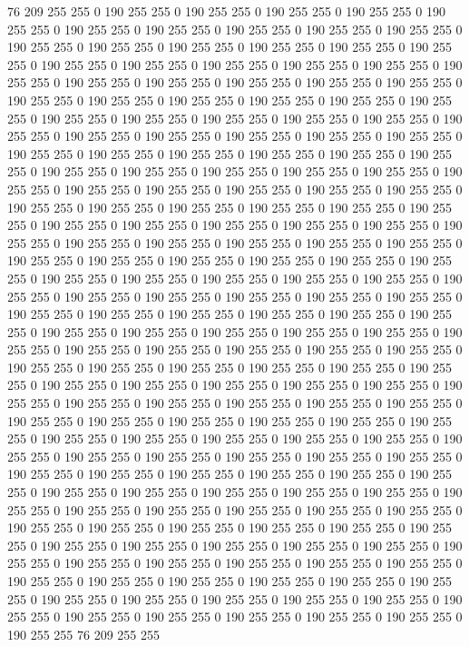 76 209 255 255 0 190 255 255 0 190 255 255 0 190 255 255 0 190 255 255 0 190 255 255 0 190 255 255 0 190 255 255 0 190 255 255 0 190 255 255 0 190 255 255 0 190 255 255 0 190 255 255 0 190 255 255 0 190 255 255 0 190 255 255 0 190 255 255 0 190 255 255 0 190 255 255 0 190 255 255 0 190 255 255 0 190 255 255 0 190 255 255 0 190 255 255 0 190 255 255 0 190 255 255 0 190 255 255 0 190 255 255 0 190 255 255 0 190 255 255 0 190 255 255 0 190 255 255 0 190 255 255 0 190 255 255 0 190 255 255 0 190 255 255 0 190 255 255 0 190 255 255 0 190 255 255 0 190 255 255 0 190 255 255 0 190 255 255 0 190 255 255 0 190 255 255 0 190 255 255 0 190 255 255 0 190 255 255 0 190 255 255 0 190 255 255 0 190 255 255 
0 190 255 255 0 190 255 255 0 190 255 255 0 190 255 255 0 190 255 255 0 190 255 255 0 190 255 255 0 190 255 255 0 190 255 255 0 190 255 255 0 190 255 255 0 190 255 255 0 190 255 255 0 190 255 255 0 190 255 255 0 190 255 255 0 190 255 255 0 190 255 255 0 190 255 255 0 190 255 255 0 190 255 255 0 190 255 255 0 190 255 255 0 190 255 255 0 190 255 255 0 190 255 255 0 190 255 255 0 190 255 255 0 190 255 255 0 190 255 255 0 190 255 255 0 190 255 255 0 190 255 255 0 190 255 255 0 190 255 255 0 190 255 255 0 190 255 255 0 190 255 255 0 190 255 255 0 190 255 255 0 190 255 255 0 190 255 255 0 190 255 255 0 190 255 255 0 190 255 255 0 190 255 255 0 190 255 255 0 190 255 255 0 190 255 255 0 190 255 255 
0 190 255 255 0 190 255 255 0 190 255 255 0 190 255 255 0 190 255 255 0 190 255 255 0 190 255 255 0 190 255 255 0 190 255 255 0 190 255 255 0 190 255 255 0 190 255 255 0 190 255 255 0 190 255 255 0 190 255 255 0 190 255 255 0 190 255 255 0 190 255 255 0 190 255 255 0 190 255 255 0 190 255 255 0 190 255 255 0 190 255 255 0 190 255 255 0 190 255 255 0 190 255 255 0 190 255 255 0 190 255 255 0 190 255 255 0 190 255 255 0 190 255 255 0 190 255 255 0 190 255 255 0 190 255 255 0 190 255 255 0 190 255 255 0 190 255 255 0 190 255 255 0 190 255 255 0 190 255 255 0 190 255 255 0 190 255 255 0 190 255 255 0 190 255 255 0 190 255 255 0 190 255 255 0 190 255 255 0 190 255 255 0 190 255 255 0 190 255 255 
0 190 255 255 0 190 255 255 0 190 255 255 0 190 255 255 0 190 255 255 0 190 255 255 0 190 255 255 0 190 255 255 0 190 255 255 0 190 255 255 0 190 255 255 0 190 255 255 0 190 255 255 0 190 255 255 0 190 255 255 0 190 255 255 0 190 255 255 0 190 255 255 0 190 255 255 0 190 255 255 0 190 255 255 0 190 255 255 0 190 255 255 0 190 255 255 0 190 255 255 0 190 255 255 0 190 255 255 0 190 255 255 0 190 255 255 0 190 255 255 0 190 255 255 0 190 255 255 0 190 255 255 0 190 255 255 0 190 255 255 0 190 255 255 0 190 255 255 0 190 255 255 0 190 255 255 0 190 255 255 0 190 255 255 0 190 255 255 0 190 255 255 0 190 255 255 0 190 255 255 0 190 255 255 0 190 255 255 0 190 255 255 0 190 255 255 76 209 255 255 
